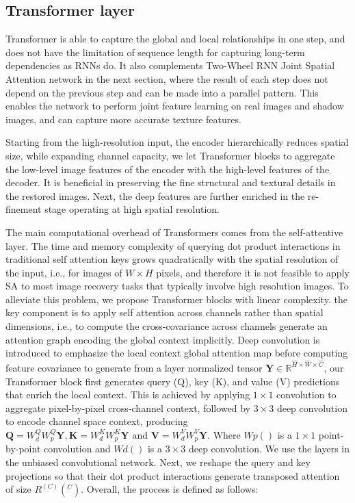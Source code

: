 \documentclass[journal]{IEEEtran}
\begin{document}
\subsection{Transformer layer }
Transformer is able to capture the global and local relationships in one step, and does not have the limitation of sequence length for capturing long-term dependencies as RNNs do. It also complements Two-Wheel RNN Joint Spatial Attention network in the next section, where the result of each step does not depend on the previous step and can be made into a parallel pattern. This enables the network to perform joint feature learning on real images and shadow images, and can capture more accurate texture features.
\par
Starting from the high-resolution input, the encoder hierarchically reduces spatial size, while expanding channel capacity, we let Transformer blocks to aggregate the
low-level image features of the encoder with the high-level features of the decoder. It is beneficial in preserving the fine structural and textural details in the restored images. Next, the deep features are further enriched in the re-finement stage operating at high spatial resolution.
\par
The main computational overhead of Transformers comes from the self-attentive layer. The time and memory complexity of querying dot product interactions in traditional self attention keys grows quadratically with the spatial resolution of the input, i.e., for images of $W\times H$ pixels, and therefore it is not feasible to apply SA to most image recovery tasks that typically involve high resolution images.
To alleviate this problem, we propose Transformer blocks with linear complexity. the key component is to apply self attention across channels rather than spatial dimensions, i.e., to compute the cross-covariance across channels generate an attention graph encoding the global context implicitly. Deep convolution is introduced to emphasize the local context global attention map before computing feature covariance to generate from a layer normalized tensor $\mathbf{Y} \in \mathbb{R}^{\hat{H} \times \hat{W} \times \hat{C}}$, our Transformer block first generates query (Q), key (K), and value (V) predictions that enrich the local context. This is achieved by applying $1\times1$ convolution to aggregate pixel-by-pixel cross-channel context, followed by $3\times3$ deep convolution to encode channel space context, producing  $\mathbf{Q}=W_{d}^{Q} W_{p}^{Q} \mathbf{Y}, \mathbf{K}=W_{d}^{K} W_{p}^{K} \mathbf{Y} \text { and } \mathbf{V}=W_{d}^{V} W_{p}^{V} \mathbf{Y}$. Where $Wp()$ is a $1×1$ point-by-point convolution and $Wd()$ is a $3\times3$ deep convolution. We use the layers in the unbiased convolutional network. Next, we reshape the query and key projections so that their dot product interactions generate transposed attention of size $R^(C)(^C)$. Overall, the process is defined as follows:
\end{document}
